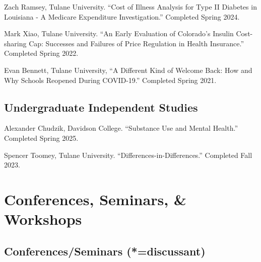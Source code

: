 \documentclass[12pt,letterpaper]{article}
\renewenvironment{itemize}{
	\begin{list}{}{
			\setlength{\leftmargin}{1em}
			\setlength{\itemsep}{0.15em}
			\setlength{\parskip}{0pt}
			\setlength{\parsep}{0.2em}
		}
	}{
	\end{list}
}
\begin{document}
\begin{itemize}
	\item  Zach Ramsey, Tulane University. ``Cost of Illness Analysis for Type II Diabetes in Louisiana - A Medicare Expenditure Investigation.'' Completed Spring 2024. 
	\item Mark Xiao, Tulane University. ``An Early Evaluation of Colorado’s Insulin Cost-sharing Cap: Successes and Failures of Price Regulation in Health Insurance.'' Completed Spring 2022.
	\item  Evan Bennett, Tulane University, ``A Different Kind of Welcome Back: How and Why Schools Reopened During COVID-19.'' Completed Spring 2021. 
\end{itemize}

\subsection*{Undergraduate Independent Studies}
\begin{itemize}
\item  Alexander Chudzik, Davidson College. ``Substance Use and Mental Health.'' Completed Spring 2025. 
\item Spencer Toomey, Tulane University. ``Differences-in-Differences.'' Completed Fall 2023. 
\end{itemize}

\section*{Conferences, Seminars, \& Workshops}
\subsection*{Conferences/Seminars (*=discussant)}
\end{document}
